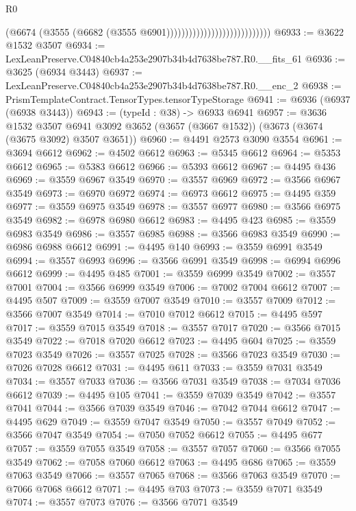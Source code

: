 \begin{lexlean}{R0}
\begin{coremodule}
                                                    (@6674
                                                      (@3555
                                                        (@6682
                                                          (@3555 @6901))))))))))))))))))))))))))))
@6933 := @3622 @1532 @3507
@6934 := LexLeanPreserve.C04840cb4a253e2907b34b4d7638be787.R0.__fits_61
@6936 := @3625 (@6934 @3443)
@6937 := LexLeanPreserve.C04840cb4a253e2907b34b4d7638be787.R0.__enc_2
@6938 := PrismTemplateContract.TensorTypes.tensorTypeStorage
@6941 := @6936 (@6937 (@6938 @3443))
@6943 := (typeId : @38) -> @6933 @6941
@6957 := @3636
    @1532
    @3507
    @6941
    @3092
    @3652
    (@3657 (@3667 @1532))
    (@3673 (@3674 (@3675 @3092) @3507 @3651))
@6960 := @4491 @2573 @3090 @3554
@6961 := @3694 @6612
@6962 := @4502 @6612
@6963 := @5345 @6612
@6964 := @5353 @6612
@6965 := @5383 @6612
@6966 := @5393 @6612
@6967 := @4495 @436
@6969 := @3559 @6967 @3549
@6970 := @3557 @6969
@6972 := @3566 @6967 @3549
@6973 := @6970 @6972
@6974 := @6973 @6612
@6975 := @4495 @359
@6977 := @3559 @6975 @3549
@6978 := @3557 @6977
@6980 := @3566 @6975 @3549
@6982 := @6978 @6980 @6612
@6983 := @4495 @423
@6985 := @3559 @6983 @3549
@6986 := @3557 @6985
@6988 := @3566 @6983 @3549
@6990 := @6986 @6988 @6612
@6991 := @4495 @140
@6993 := @3559 @6991 @3549
@6994 := @3557 @6993
@6996 := @3566 @6991 @3549
@6998 := @6994 @6996 @6612
@6999 := @4495 @485
@7001 := @3559 @6999 @3549
@7002 := @3557 @7001
@7004 := @3566 @6999 @3549
@7006 := @7002 @7004 @6612
@7007 := @4495 @507
@7009 := @3559 @7007 @3549
@7010 := @3557 @7009
@7012 := @3566 @7007 @3549
@7014 := @7010 @7012 @6612
@7015 := @4495 @597
@7017 := @3559 @7015 @3549
@7018 := @3557 @7017
@7020 := @3566 @7015 @3549
@7022 := @7018 @7020 @6612
@7023 := @4495 @604
@7025 := @3559 @7023 @3549
@7026 := @3557 @7025
@7028 := @3566 @7023 @3549
@7030 := @7026 @7028 @6612
@7031 := @4495 @611
@7033 := @3559 @7031 @3549
@7034 := @3557 @7033
@7036 := @3566 @7031 @3549
@7038 := @7034 @7036 @6612
@7039 := @4495 @105
@7041 := @3559 @7039 @3549
@7042 := @3557 @7041
@7044 := @3566 @7039 @3549
@7046 := @7042 @7044 @6612
@7047 := @4495 @629
@7049 := @3559 @7047 @3549
@7050 := @3557 @7049
@7052 := @3566 @7047 @3549
@7054 := @7050 @7052 @6612
@7055 := @4495 @677
@7057 := @3559 @7055 @3549
@7058 := @3557 @7057
@7060 := @3566 @7055 @3549
@7062 := @7058 @7060 @6612
@7063 := @4495 @686
@7065 := @3559 @7063 @3549
@7066 := @3557 @7065
@7068 := @3566 @7063 @3549
@7070 := @7066 @7068 @6612
@7071 := @4495 @703
@7073 := @3559 @7071 @3549
@7074 := @3557 @7073
@7076 := @3566 @7071 @3549

\end{coremodule}
\end{lexlean}
